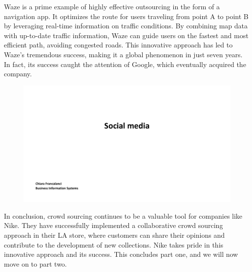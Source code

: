 Waze is a prime example of highly effective outsourcing in the form of
a navigation app. It optimizes the route for users traveling from point
A to point B by leveraging real-time information on traffic conditions.
By combining map data with up-to-date traffic information, Waze can
guide users on the fastest and most efficient path, avoiding congested
roads. This innovative approach has led to Waze's tremendous success,
making it a global phenomenon in just seven years. In fact, its success
caught the attention of Google, which eventually acquired the company.

\begin{figure}[!h]
    \centering
    \includegraphics[page=10, trim = 1.5cm 5cm 3cm 4cm, clip, width=\textwidth]{images/04 - Social_Media.pdf}
\end{figure}

In conclusion, crowd sourcing continues to be a valuable tool for
companies like Nike. They have successfully implemented a collaborative
crowd sourcing approach in their LA store, where customers can share
their opinions and contribute to the development of new collections.
Nike takes pride in this innovative approach and its success. This
concludes part one, and we will now move on to part two.
